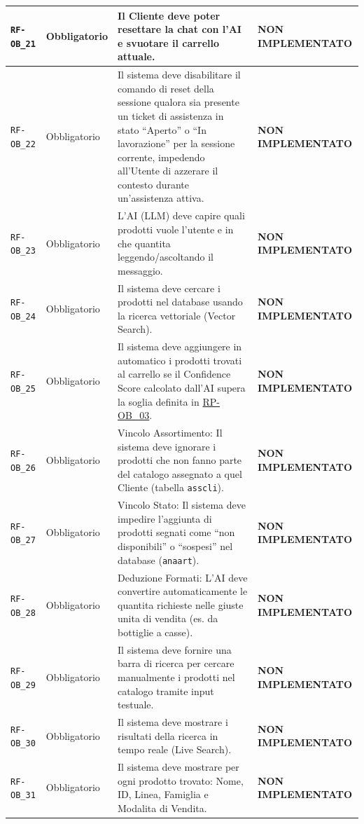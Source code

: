 \documentclass[a4paper, 11pt, oneside]{scrartcl}
\begin{document}
\begin{longtable}{|>{\raggedright\arraybackslash}p{}|>{\raggedright\arraybackslash}p{}|>{\raggedright\arraybackslash}p{}|>{\raggedright\arraybackslash}p{}|}
    \hline
    \texttt{RF-OB\_21} & Obbligatorio & Il Cliente deve poter resettare la chat con l'AI e svuotare il carrello attuale. & \textbf{NON IMPLEMENTATO} \\
    \hline
    \texttt{RF-OB\_22} & Obbligatorio & Il sistema deve disabilitare il comando di reset della sessione qualora sia presente un ticket di assistenza in stato ``Aperto'' o ``In lavorazione'' per la sessione corrente, impedendo all'Utente di azzerare il contesto durante un'assistenza attiva. & \textbf{NON IMPLEMENTATO} \\
    \hline
    \texttt{RF-OB\_23} & Obbligatorio & L'AI (LLM) deve capire quali prodotti vuole l'utente e in che quantita leggendo/ascoltando il messaggio. & \textbf{NON IMPLEMENTATO} \\
    \hline
    \texttt{RF-OB\_24} & Obbligatorio & Il sistema deve cercare i prodotti nel database usando la ricerca vettoriale (Vector Search). & \textbf{NON IMPLEMENTATO} \\
    \hline
    \texttt{RF-OB\_25} & Obbligatorio & Il sistema deve aggiungere in automatico i prodotti trovati al carrello se il Confidence Score calcolato dall'AI supera la soglia definita in \hyperlink{rp-ob_3}{RP-OB\_03}. & \textbf{NON IMPLEMENTATO} \\
    \hline
    \texttt{RF-OB\_26} & Obbligatorio & Vincolo Assortimento: Il sistema deve ignorare i prodotti che non fanno parte del catalogo assegnato a quel Cliente (tabella \texttt{asscli}). & \textbf{NON IMPLEMENTATO} \\
    \hline
    \texttt{RF-OB\_27} & Obbligatorio & Vincolo Stato: Il sistema deve impedire l'aggiunta di prodotti segnati come ``non disponibili'' o ``sospesi'' nel database (\texttt{anaart}). & \textbf{NON IMPLEMENTATO} \\
    \hline
    \texttt{RF-OB\_28} & Obbligatorio & Deduzione Formati: L'AI deve convertire automaticamente le quantita richieste nelle giuste unita di vendita (es. da bottiglie a casse). & \textbf{NON IMPLEMENTATO} \\
    \hline
    \texttt{RF-OB\_29} & Obbligatorio & Il sistema deve fornire una barra di ricerca per cercare manualmente i prodotti nel catalogo tramite input testuale. & \textbf{NON IMPLEMENTATO} \\
    \hline
    \texttt{RF-OB\_30} & Obbligatorio & Il sistema deve mostrare i risultati della ricerca in tempo reale (Live Search). & \textbf{NON IMPLEMENTATO} \\
    \hline
    \texttt{RF-OB\_31} & Obbligatorio & Il sistema deve mostrare per ogni prodotto trovato: Nome, ID, Linea, Famiglia e Modalita di Vendita. & \textbf{NON IMPLEMENTATO} \\

\end{longtable}
\end{document}
